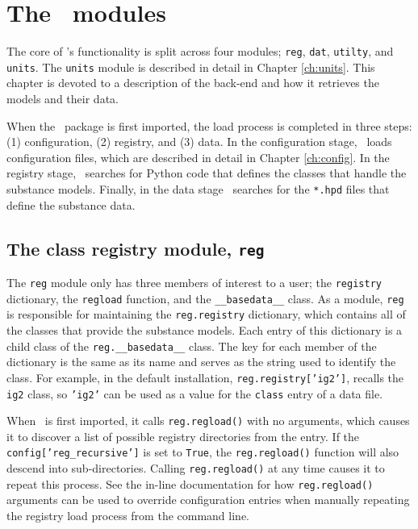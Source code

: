 \chapter{The \PM\ modules}

The core of \PM's functionality is split across four modules; \texttt{reg}, \texttt{dat}, \texttt{utilty}, and \texttt{units}.  The \texttt{units} module is described in detail in Chapter \ref{ch:units}.  This chapter is devoted to a description of the back-end and how it retrieves the models and their data.

When the \PM\ package is first imported, the load process is completed in three steps: (1) configuration, (2) registry, and (3) data.  In the configuration stage, \PM\ loads configuration files, which are described in detail in Chapter \ref{ch:config}.  In the registry stage, \PM\ searches for Python code that defines the classes that handle the substance models.  Finally, in the data stage \PM\ searches for the \texttt{*.hpd} files that define the substance data. 

\section{The class registry module, \texttt{reg}}

The \texttt{reg} module only has three members of interest to a user; the \texttt{registry} dictionary, the \texttt{regload} function, and the \verb|__basedata__| class.  As a module, \texttt{reg} is responsible for maintaining the \texttt{reg.registry} dictionary, which contains all of the classes that provide the substance models.  Each entry of this dictionary is a child class of the \verb|reg.__basedata__| class.  The key for each member of the dictionary is the same as its name and serves as the string used to identify the class.  For example, in the default installation, \texttt{reg.registry['ig2']}, recalls the \texttt{ig2} class, so \texttt{'ig2'} can be used as a value for the \texttt{class} entry of a data file.

When \PM\ is first imported, it calls \texttt{reg.regload()} with no arguments, which causes it to discover a list of possible registry directories from the  entry.  If the \texttt{config['reg_recursive']} is set to \texttt{True}, the \texttt{reg.regload()} function will also descend into sub-directories.  Calling \texttt{reg.regload()} at any time causes it to repeat this process.  See the in-line documentation for how \texttt{reg.regload()} arguments can be used to override configuration entries when manually repeating the registry load process from the command line.


